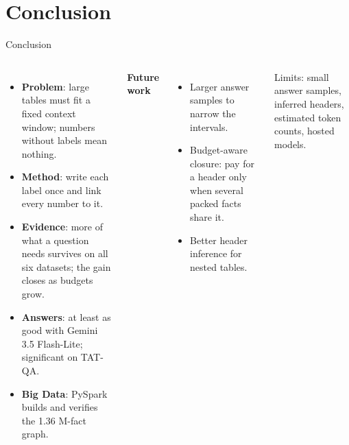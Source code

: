 \documentclass[aspectratio=169,11pt]{beamer}
\begin{document}
\section{Conclusion}
\begin{frame}{Conclusion}
\begin{columns}[T]
\small
\begin{itemize}\itemsep5pt
\item \textbf{Problem}: large tables must fit a fixed context window; numbers without labels mean nothing.
\item \textbf{Method}: write each label once and link every number to it.
\item \textbf{Evidence}: more of what a question needs survives on all six datasets; the gain closes as budgets grow.
\item \textbf{Answers}: at least as good with Gemini 3.5 Flash-Lite; significant on TAT-QA.
\item \textbf{Big Data}: PySpark builds and verifies the 1.36 M-fact graph.
\end{itemize}
\small
\textbf{Future work}
\begin{itemize}\itemsep4pt\footnotesize
\item Larger answer samples to narrow the intervals.
\item Budget-aware closure: pay for a header only when several packed facts share it.
\item Better header inference for nested tables.
\end{itemize}
\vspace{.6em}
{\scriptsize\color{muted}Limits: small answer samples, inferred headers, estimated token counts, hosted models.}
\end{columns}
\end{frame}
\end{document}
